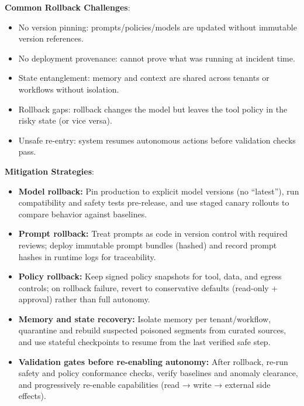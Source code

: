 \begin{TNtwocol}
    \textbf{Common Rollback Challenges}:
    \begin{itemize}
        \item No version pinning: prompts/policies/models are updated without immutable version references.
        \item No deployment provenance: cannot prove what was running at incident time.
        \item State entanglement: memory and context are shared across tenants or workflows without isolation.
        \item Rollback gaps: rollback changes the model but leaves the tool policy in the risky state (or vice versa).
        \item Unsafe re-entry: system resumes autonomous actions before validation checks pass.
    \end{itemize}

    \textbf{Mitigation Strategies}:
    \begin{itemize}
        \item \textbf{Model rollback:} Pin production to explicit model versions (no ``latest''), run compatibility and safety tests pre-release, and use staged canary rollouts to compare behavior against baselines.
        \item \textbf{Prompt rollback:} Treat prompts as code in version control with required reviews; deploy immutable prompt bundles (hashed) and record prompt hashes in runtime logs for traceability.
        \item \textbf{Policy rollback:} Keep signed policy snapshots for tool, data, and egress controls; on rollback failure, revert to conservative defaults (read-only + approval) rather than full autonomy.
        \item \textbf{Memory and state recovery:} Isolate memory per tenant/workflow, quarantine and rebuild suspected poisoned segments from curated sources, and use stateful checkpoints to resume from the last verified safe step.
        \item \textbf{Validation gates before re-enabling autonomy:} After rollback, re-run safety and policy conformance checks, verify baselines and anomaly clearance, and progressively re-enable capabilities (read → write → external side effects).
    \end{itemize}

\end{TNtwocol}